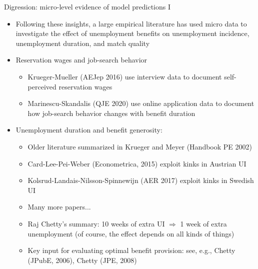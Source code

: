 \documentclass[9pt]{beamer}
\newcommand{\bit}{\begin{itemize}}
\newcommand{\eit}{\end{itemize}}
\begin{document}
\begin{frame}{Digression: micro-level evidence of model predictions I}

\bit
\setlength\itemsep{1.5em}

\item Following these insights, a large empirical literature has used micro data to investigate the effect of unemployment benefits on unemployment incidence, unemployment duration, and match quality

\item Reservation wages and job-search behavior
\bit
	\setlength\itemsep{0.5em}
	\item Krueger-Mueller (AEJep 2016) use interview data to document self-perceived reservation wages
	\item Marinescu-Skandalis (QJE 2020) use online application data to document how job-search behavior changes with benefit duration
\eit

\item Unemployment duration and benefit generosity:
\bit
	\setlength\itemsep{0.5em}
	\item Older literature summarized in Krueger and Meyer (Handbook PE 2002)
	
	\item Card-Lee-Pei-Weber (Econometrica, 2015) exploit kinks in Austrian UI
	
	\item Kolsrud-Landais-Nilsson-Spinnewijn (AER 2017) exploit kinks in Swedish UI
	
	\item Many more papers...
	
	\item Raj Chetty's summary: 10 weeks of extra UI $\Rightarrow$ 1 week of extra unemployment (of course, the effect depends on all kinds of things)
	
	\item Key input for evaluating optimal benefit provision: see, e.g., Chetty (JPubE, 2006), Chetty (JPE, 2008)
\eit

\eit


\end{frame}
\end{document}
